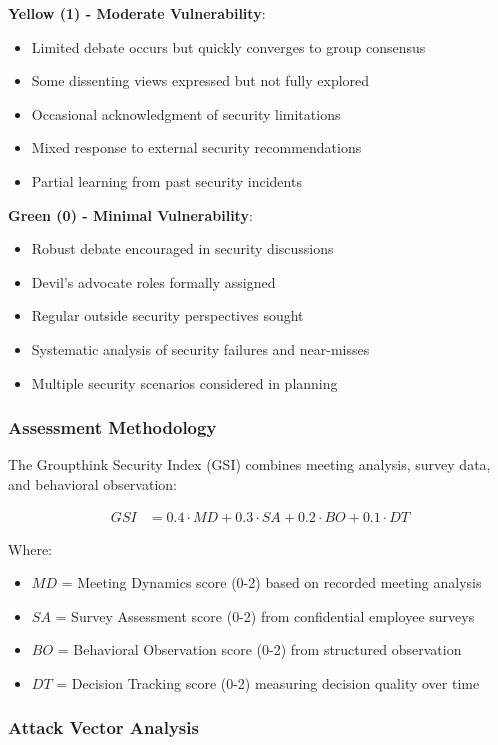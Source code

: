 \documentclass[11pt,a4paper]{article}
\begin{document}
\textbf{Yellow (1) - Moderate Vulnerability}:
\begin{itemize}
\item Limited debate occurs but quickly converges to group consensus
\item Some dissenting views expressed but not fully explored
\item Occasional acknowledgment of security limitations
\item Mixed response to external security recommendations
\item Partial learning from past security incidents
\end{itemize}

\textbf{Green (0) - Minimal Vulnerability}:
\begin{itemize}
\item Robust debate encouraged in security discussions
\item Devil's advocate roles formally assigned
\item Regular outside security perspectives sought
\item Systematic analysis of security failures and near-misses
\item Multiple security scenarios considered in planning
\end{itemize}

\subsubsection{Assessment Methodology}

The Groupthink Security Index (GSI) combines meeting analysis, survey data, and behavioral observation:

\begin{align}
GSI &= 0.4 \cdot MD + 0.3 \cdot SA + 0.2 \cdot BO + 0.1 \cdot DT
\end{align}

Where:
\begin{itemize}
\item $MD$ = Meeting Dynamics score (0-2) based on recorded meeting analysis
\item $SA$ = Survey Assessment score (0-2) from confidential employee surveys
\item $BO$ = Behavioral Observation score (0-2) from structured observation
\item $DT$ = Decision Tracking score (0-2) measuring decision quality over time
\end{itemize}

\subsubsection{Attack Vector Analysis}
\end{document}
